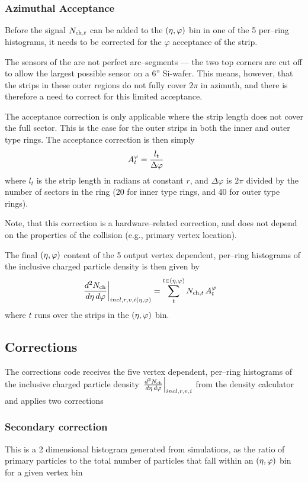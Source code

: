 \documentclass[11pt]{article}
\begin{document}
\subsubsection{Azimuthal Acceptance}

Before the signal $\mult[,t]$ can be added to the $\etaphi$
bin in one of the 5 per--ring histograms, it needs to be corrected for
the $\varphi$ acceptance of the strip.

The sensors of the \FMD{} are not perfect arc--segments --- the two
top corners are cut off to allow the largest possible sensor on a 6''
Si-wafer.   This means, however, that the strips in these outer
regions do not fully cover $2\pi$ in azimuth, and there is therefore a
need to correct for this limited acceptance.  

The acceptance correction is only applicable where the strip length
does not cover the full sector.  This is the case for the outer strips
in both the inner and outer type rings.  The acceptance correction is
then simply 
\begin{align}
  \label{eq:acc_corr}
  \Corners{} &= \frac{l_t}{\Delta\varphi}\quad
\end{align}
where $l_t$ is the strip length in radians at constant $r$, and
$\Delta\varphi$ is $2\pi$ divided by the number of sectors in the
ring (20 for inner type rings, and 40 for outer type rings). 

Note, that this correction is a hardware--related correction, and does
not depend on the properties of the collision (e.g., primary vertex
location). 

The final $\etaphi$ content of the 5 output vertex dependent,
per--ring histograms of the inclusive charged particle density is then
given by
\begin{align}
  \label{eq:density}
  \dndetadphi[incl,r,v,i\etaphi] &= \sum_t^{t\in\etaphi}
  \mult[,t]\,\Corners{}
\end{align}
where $t$ runs over the strips in the $\etaphi$ bin. 

\subsection{Corrections}
\label{sec:sub:corrector}

The corrections code receives the five vertex dependent,
per--ring histograms of the inclusive charged particle density
$\dndetadphi[incl,r,v,i]$ from the density calculator and applies
two corrections 

\subsubsection{Secondary correction}
This is a 2 dimensional histogram generated from simulations, as the
ratio of primary particles to the total number of particles that fall
within an $\etaphi$ bin for a given vertex bin
\end{document}
